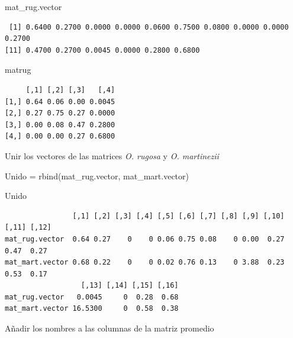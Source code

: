 \documentclass[
  12pt,
  letterpaper,
]{book}
\newenvironment{Shaded}{\begin{snugshade}}{\end{snugshade}}
\newcommand{\CommentTok}[1]{\textcolor[rgb]{0.37,0.37,0.37}{#1}}
\newcommand{\FunctionTok}[1]{\textcolor[rgb]{0.28,0.35,0.67}{#1}}
\newcommand{\NormalTok}[1]{\textcolor[rgb]{0.00,0.23,0.31}{#1}}
\newcommand{\OtherTok}[1]{\textcolor[rgb]{0.00,0.23,0.31}{#1}}
\newcommand{\SpecialCharTok}[1]{\textcolor[rgb]{0.37,0.37,0.37}{#1}}
\newcommand{\StringTok}[1]{\textcolor[rgb]{0.13,0.47,0.30}{#1}}
\begin{document}
\begin{Shaded}
\begin{Highlighting}[]
\NormalTok{mat\_rug.vector}
\end{Highlighting}
\end{Shaded}

\begin{verbatim}
 [1] 0.6400 0.2700 0.0000 0.0000 0.0600 0.7500 0.0800 0.0000 0.0000 0.2700
[11] 0.4700 0.2700 0.0045 0.0000 0.2800 0.6800
\end{verbatim}

\begin{Shaded}
\begin{Highlighting}[]
\NormalTok{matrug}
\end{Highlighting}
\end{Shaded}

\begin{verbatim}
     [,1] [,2] [,3]   [,4]
[1,] 0.64 0.06 0.00 0.0045
[2,] 0.27 0.75 0.27 0.0000
[3,] 0.00 0.08 0.47 0.2800
[4,] 0.00 0.00 0.27 0.6800
\end{verbatim}

Unir los vectores de las matrices \emph{O. rugosa} y \emph{O.
martinezii}

\begin{Shaded}
\begin{Highlighting}[]
\NormalTok{Unido }\OtherTok{=} \FunctionTok{rbind}\NormalTok{(mat\_rug.vector, mat\_mart.vector)}

\NormalTok{Unido}
\end{Highlighting}
\end{Shaded}

\begin{verbatim}
                [,1] [,2] [,3] [,4] [,5] [,6] [,7] [,8] [,9] [,10] [,11] [,12]
mat_rug.vector  0.64 0.27    0    0 0.06 0.75 0.08    0 0.00  0.27  0.47  0.27
mat_mart.vector 0.68 0.22    0    0 0.02 0.76 0.13    0 3.88  0.23  0.53  0.17
                  [,13] [,14] [,15] [,16]
mat_rug.vector   0.0045     0  0.28  0.68
mat_mart.vector 16.5300     0  0.58  0.38
\end{verbatim}

Añadir los nombres a las columnas de la matriz promedio

\begin{Shaded}
\end{Shaded}
\end{document}
